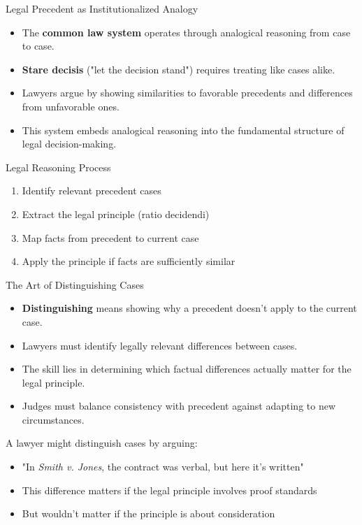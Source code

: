 \documentclass{beamer}
\begin{document}
	
	\begin{frame}{Legal Precedent as Institutionalized Analogy}
		\begin{itemize}
			\item The \textbf{common law system} operates through analogical reasoning from case to case.
			\item \textbf{Stare decisis} ("let the decision stand") requires treating like cases alike.
			\item Lawyers argue by showing similarities to favorable precedents and differences from unfavorable ones.
			\item This system embeds analogical reasoning into the fundamental structure of legal decision-making.
		\end{itemize}
		
		\begin{block}{Legal Reasoning Process}
			\begin{enumerate}
				\item Identify relevant precedent cases
				\item Extract the legal principle (ratio decidendi)
				\item Map facts from precedent to current case
				\item Apply the principle if facts are sufficiently similar
			\end{enumerate}
		\end{block}
	\end{frame}
	
	\begin{frame}{The Art of Distinguishing Cases}
		\begin{itemize}
			\item \textbf{Distinguishing} means showing why a precedent doesn't apply to the current case.
			\item Lawyers must identify legally relevant differences between cases.
			\item The skill lies in determining which factual differences actually matter for the legal principle.
			\item Judges must balance consistency with precedent against adapting to new circumstances.
		\end{itemize}
		
		\begin{example}
			A lawyer might distinguish cases by arguing:
			\begin{itemize}
				\item "In \textit{Smith v. Jones}, the contract was verbal, but here it's written"
				\item This difference matters if the legal principle involves proof standards
				\item But wouldn't matter if the principle is about consideration
			\end{itemize}
		\end{example}
	\end{frame}
	
\end{document}
